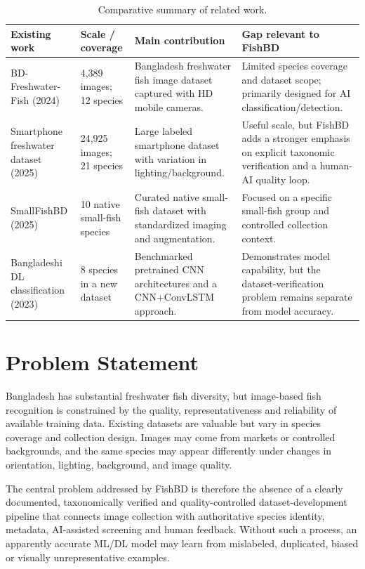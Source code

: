\documentclass[12pt,a4paper]{article}
\begin{document}
\begin{table}[H]
\centering
\caption{Comparative summary of related work.}
\small
\begin{tabularx}{\textwidth}{|p{1.2in}|p{1.0in}|X|p{1.5in}|}
\hline
\textbf{Existing work} & \textbf{Scale / coverage} & \textbf{Main contribution} & \textbf{Gap relevant to FishBD} \\
\hline
BD-Freshwater-Fish (2024) \cite{ref2} & 4,389 images; 12 species & Bangladesh freshwater fish image dataset captured with HD mobile cameras. & Limited species coverage and dataset scope; primarily designed for AI classification/detection. \\
\hline
Smartphone freshwater dataset (2025) \cite{ref3} & 24,925 images; 21 species & Large labeled smartphone dataset with variation in lighting/background. & Useful scale, but FishBD adds a stronger emphasis on explicit taxonomic verification and a human-AI quality loop. \\
\hline
SmallFishBD (2025) \cite{ref4} & 10 native small-fish species & Curated native small-fish dataset with standardized imaging and augmentation. & Focused on a specific small-fish group and controlled collection context. \\
\hline
Bangladeshi DL classification (2023) \cite{ref5} & 8 species in a new dataset & Benchmarked pretrained CNN architectures and a CNN+ConvLSTM approach. & Demonstrates model capability, but the dataset-verification problem remains separate from model accuracy. \\
\hline
\end{tabularx}
\end{table}

\section{Problem Statement}

Bangladesh has substantial freshwater fish diversity, but image-based fish recognition is constrained by the quality, representativeness and reliability of available training data. Existing datasets are valuable but vary in species coverage and collection design. Images may come from markets or controlled backgrounds, and the same species may appear differently under changes in orientation, lighting, background, and image quality.

The central problem addressed by FishBD is therefore the absence of a clearly documented, taxonomically verified and quality-controlled dataset-development pipeline that connects image collection with authoritative species identity, metadata, AI-assisted screening and human feedback. Without such a process, an apparently accurate ML/DL model may learn from mislabeled, duplicated, biased or visually unrepresentative examples.
\end{document}
